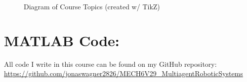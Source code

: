 \documentclass[]{article}
\numberwithin{equation}{section}
\begin{document}
\begin{figure}[h]
{}
	\caption{Diagram of Course Topics (created w/ TikZ)}
	\label{fig:pblm1}
\end{figure}

\newpage
\section{}

















\newpage
\appendix
\section{MATLAB Code:}\label{apx:matlab}
All code I write in this course can be found on my GitHub repository:\\
\href{https://github.com/jonaswagner2826/MECH6V29_MultiagentRoboticSystems}{https://github.com/jonaswagner2826/MECH6V29\_MultiagentRoboticSystems}

% 

% 
% 
\end{document}
